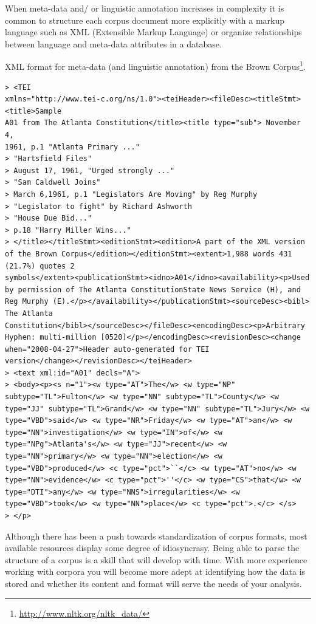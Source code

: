 \documentclass[
  letterpaper,
]{latex/krantz}
\DeclareRobustCommand{\href}[2]{#2\footnote{\url{#1}}}
\begin{document}
When meta-data and/ or linguistic annotation increases in complexity it
is common to structure each corpus document more explicitly with a
markup language such as XML (Extensible Markup Language) or organize
relationships between language and meta-data attributes in a database.

XML format for meta-data (and linguistic annotation) from the
\href{http://www.nltk.org/nltk_data/}{Brown Corpus}.

\begin{verbatim}
> <TEI
xmlns="http://www.tei-c.org/ns/1.0"><teiHeader><fileDesc><titleStmt><title>Sample
A01 from The Atlanta Constitution</title><title type="sub"> November 4,
1961, p.1 "Atlanta Primary ..."
> "Hartsfield Files"
> August 17, 1961, "Urged strongly ..."
> "Sam Caldwell Joins"
> March 6,1961, p.1 "Legislators Are Moving" by Reg Murphy
> "Legislator to fight" by Richard Ashworth
> "House Due Bid..."
> p.18 "Harry Miller Wins..."
> </title></titleStmt><editionStmt><edition>A part of the XML version
of the Brown Corpus</edition></editionStmt><extent>1,988 words 431
(21.7%) quotes 2
symbols</extent><publicationStmt><idno>A01</idno><availability><p>Used
by permission of The Atlanta ConstitutionState News Service (H), and
Reg Murphy (E).</p></availability></publicationStmt><sourceDesc><bibl>
The Atlanta
Constitution</bibl></sourceDesc></fileDesc><encodingDesc><p>Arbitrary
Hyphen: multi-million [0520]</p></encodingDesc><revisionDesc><change
when="2008-04-27">Header auto-generated for TEI
version</change></revisionDesc></teiHeader>
> <text xml:id="A01" decls="A">
> <body><p><s n="1"><w type="AT">The</w> <w type="NP"
subtype="TL">Fulton</w> <w type="NN" subtype="TL">County</w> <w
type="JJ" subtype="TL">Grand</w> <w type="NN" subtype="TL">Jury</w> <w
type="VBD">said</w> <w type="NR">Friday</w> <w type="AT">an</w> <w
type="NN">investigation</w> <w type="IN">of</w> <w
type="NPg">Atlanta's</w> <w type="JJ">recent</w> <w
type="NN">primary</w> <w type="NN">election</w> <w
type="VBD">produced</w> <c type="pct">``</c> <w type="AT">no</w> <w
type="NN">evidence</w> <c type="pct">''</c> <w type="CS">that</w> <w
type="DTI">any</w> <w type="NNS">irregularities</w> <w
type="VBD">took</w> <w type="NN">place</w> <c type="pct">.</c> </s>
> </p>
\end{verbatim}

Although there has been a push towards standardization of corpus
formats, most available resources display some degree of idiosyncrasy.
Being able to parse the structure of a corpus is a skill that will
develop with time. With more experience working with corpora you will
become more adept at identifying how the data is stored and whether its
content and format will serve the needs of your analysis.
\end{document}
